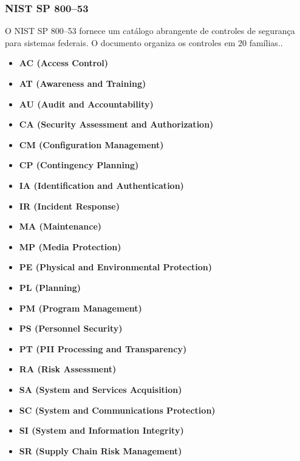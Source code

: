         \subsubsection{NIST SP 800--53}
            O NIST SP 800--53 fornece um catálogo abrangente de controles de segurança para sistemas federais\cite{nistSP80053}. O documento organiza os controles em 20 famílias.\cite{nistSP80053}.
            \begin{itemize}      
                \item \textbf{AC (Access Control)}
                \item \textbf{AT (Awareness and Training)}
                \item \textbf{AU (Audit and Accountability)}
                \item \textbf{CA (Security Assessment and Authorization)}
                \item \textbf{CM (Configuration Management)}
                \item \textbf{CP (Contingency Planning)}
                \item \textbf{IA (Identification and Authentication)}
                \item \textbf{IR (Incident Response)}
                \item \textbf{MA (Maintenance)}
                \item \textbf{MP (Media Protection)}
                \item \textbf{PE (Physical and Environmental Protection)}
                \item \textbf{PL (Planning)}
                \item \textbf{PM (Program Management)}
                \item \textbf{PS (Personnel Security)}
                \item \textbf{PT (PII Processing and Transparency)}
                \item \textbf{RA (Risk Assessment)}
                \item \textbf{SA (System and Services Acquisition)}
                \item \textbf{SC (System and Communications Protection)}
                \item \textbf{SI (System and Information Integrity)}
                \item \textbf{SR (Supply Chain Risk Management)}
            \end{itemize}\cite{nistSP80053}

